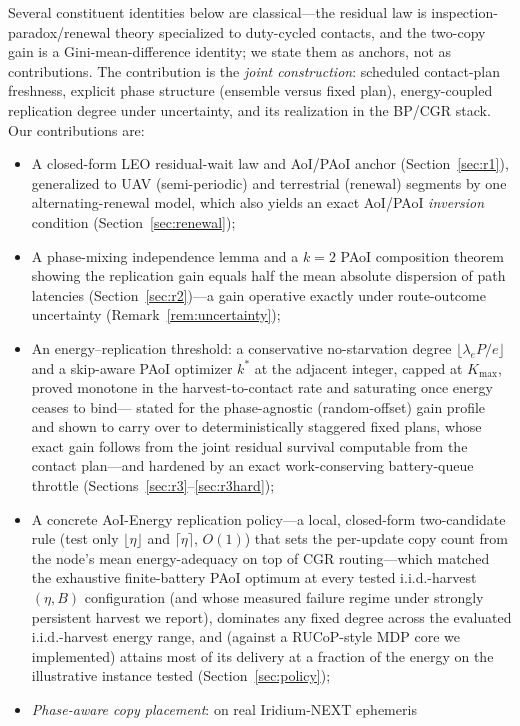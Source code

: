 \documentclass[twocolumn,3p,times,procedia]{elsarticle}
\newcommand{\kstar}{k^{\ast}}
\begin{document}
Several constituent identities below are classical---the residual law is
inspection-paradox/renewal theory specialized to duty-cycled contacts,
and the two-copy gain is a Gini-mean-difference identity; we state them
as anchors, not as contributions. The contribution is the \emph{joint
construction}: scheduled contact-plan freshness, explicit phase
structure (ensemble versus fixed plan), energy-coupled replication
degree under uncertainty, and its realization in the BP/CGR stack.
Our contributions are:
\begin{itemize}
\item A closed-form LEO residual-wait law and AoI/PAoI anchor
(Section~\ref{sec:r1}), generalized to UAV (semi-periodic) and
terrestrial (renewal) segments by one alternating-renewal model, which
also yields an exact AoI/PAoI \emph{inversion} condition
(Section~\ref{sec:renewal});
\item A phase-mixing independence lemma and a $k{=}2$ PAoI composition
theorem showing the replication gain equals half the mean absolute
dispersion of path latencies (Section~\ref{sec:r2})---a gain operative
exactly under route-outcome uncertainty
(Remark~\ref{rem:uncertainty});
\item An energy--replication threshold: a conservative no-starvation
degree $\lfloor\lambda_e P/e\rfloor$ and a skip-aware PAoI optimizer
$\kstar$ at the adjacent integer, capped at $K_{\max}$, proved monotone in
the harvest-to-contact rate and saturating once energy ceases to bind---
stated for the phase-agnostic (random-offset) gain profile and shown to
carry over to deterministically staggered fixed plans, whose exact gain
follows from the joint residual survival computable from the contact
plan---and hardened by an exact work-conserving battery-queue throttle
(Sections~\ref{sec:r3}--\ref{sec:r3hard});
\item A concrete AoI-Energy replication policy---a local, closed-form
two-candidate rule (test only $\lfloor\eta\rfloor$ and $\lceil\eta\rceil$,
$O(1)$) that sets the per-update copy count from the node's mean
energy-adequacy on top of CGR routing---which matched the exhaustive
finite-battery PAoI
optimum at every tested i.i.d.-harvest $(\eta,B)$ configuration (and
whose measured failure regime under strongly persistent harvest we
report), dominates any
fixed degree across the evaluated i.i.d.-harvest energy range, and (against a RUCoP-style MDP core
we implemented) attains most of its delivery at a fraction of the
energy on the illustrative instance tested (Section~\ref{sec:policy});
\item \emph{Phase-aware copy placement}: on real Iridium-NEXT ephemeris

\end{itemize}
\end{document}
